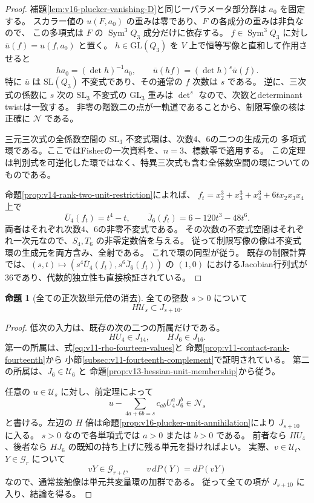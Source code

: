 \documentclass[a4paper,11pt]{ltjsarticle}
\theoremstyle{definition}
\newtheorem{theorem}{命題}[section]
\begin{document}
\begin{proof}
補題\ref{lem:v16-plucker-vanishing-D}と同じ一パラメータ部分群は $a_0$ を固定する。
スカラー値の $u(F,a_0)$ の重みは零であり、$F$ の各成分の重みは非負なので、
この多項式は $F$ の $\operatorname{Sym}^3Q_3$ 成分だけに依存する。
$f\in\operatorname{Sym}^3Q_3$ に対し $\overline u(f)=u(f,a_0)$ と置く。
$h\in\mathrm{GL}(Q_3)$ を $V$ 上で恒等写像と直和して作用させると
\[
 h a_0=(\det h)^{-1}a_0,
 \qquad \overline u(hf)=(\det h)^s\overline u(f).
\]
特に $\overline u$ は $\mathrm{SL}(Q_3)$ 不変式であり、その通常の $f$ 次数は $s$ である。
逆に、三次式の係数に $s$ 次の $\mathrm{SL}_3$ 不変式の $\mathrm{GL}_3$ 重みは
$\det^s$ なので、次数とdeterminant twistは一致する。
非零の階数二の点が一軌道であることから、制限写像の核は正確に $\mathcal N$ である。

三元三次式の全係数空間の $\mathrm{SL}_3$ 不変式環は、次数4、6の二つの生成元の
多項式環である。ここではFisherの一次資料\cite[\S3.3,\S4,
Lemma~4.3, Theorem~4.4(i)]{Fisher2008}を、$n=3$、標数零で適用する。
この定理は判別式を可逆化した環ではなく、特異三次式も含む全係数空間の環についてのものである。

命題\ref{prop:v14-rank-two-unit-restriction}によれば、
$f_t=x_2^3+x_3^3+x_4^3+6t x_2x_3x_4$ 上で
\[
 \overline U_4(f_t)=t^4-t,\qquad
 \overline J_6(f_t)=6-120t^3-48t^6.
\]
両者はそれぞれ次数4、6の非零不変式である。
その次数の不変式空間はそれぞれ一次元なので、$S_4,T_6$ の非零定数倍を与える。
従って制限写像の像は不変式環の生成元を両方含み、全射である。
これで環の同型が従う。
既存の制限計算では、$(s,t)\mapsto(s^4\overline U_4(f_t),s^6\overline J_6(f_t))$
の $(1,0)$ におけるJacobian行列式が36であり、代数的独立性も直接検証されている。
\end{proof}

\begin{theorem}[全ての正次数単元倍の消去]
\label{thm:v16-positive-unit-hessian-annihilation}
全ての整数 $s>0$ について
\begin{equation}\label{eq:v16-all-positive-unit-hessian}
 H\mathcal U_s\subset J_{s+10}.
\end{equation}
\end{theorem}

\begin{proof}
低次の入力は、既存の次の二つの所属だけである。
\[
 HU_4\in J_{14},\qquad HJ_6\in J_{16}.
\]
第一の所属は、式\eqref{eq:v11-rho-fourteen-values}と
命題\ref{prop:v11-contact-rank-fourteenth}から
小節\ref{subsec:v11-fourteenth-complement}で証明されている。
第二の所属は、$J_6\in\mathcal U_6$ と
命題\ref{prop:v13-hessian-unit-membership}から従う。

任意の $u\in\mathcal U_s$ に対し、前定理によって
\[
 u-\sum_{4a+6b=s}c_{ab}U_4^aJ_6^b\in\mathcal N_s
\]
と書ける。左辺の $H$ 倍は命題\ref{prop:v16-plucker-unit-annihilation}により
$J_{s+10}$ に入る。
$s>0$ なので各単項式では $a>0$ または $b>0$ である。
前者なら $HU_4$、後者なら $HJ_6$ の既知の持ち上げに残る単元を掛ければよい。
実際、$v\in\mathcal U_t$、$Y\in\mathcal G_r$ について
\[
 vY\in\mathcal G_{r+t},\qquad v\,dP(Y)=dP(vY)
\]
なので、通常接触像は単元共変量環の加群である。
従って全ての項が $J_{s+10}$ に入り、結論を得る。
\end{proof}
\end{document}
